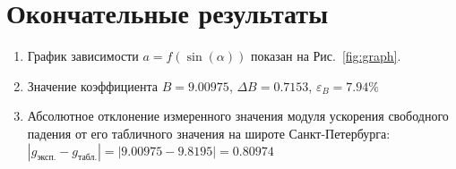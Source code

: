 \section{Окончательные результаты}
\begin{enumerate}
    \item График зависимости $a = f(\sin(\alpha))$ показан на Рис.~\ref{fig:graph}.
    \item Значение коэффициента $B = 9.00975$, $\Delta B = 0.7153$, $\varepsilon_B = 7.94 \%$
    \item Абсолютное отклонение измеренного значения модуля ускорения свободного падения
        от его табличного значения на широте Санкт-Петербурга:
        $ \left| g_{\text{эксп.}} - g_{\text{табл.}} \right| = |9.00975 - 9.8195| = 0.80974 $
\end{enumerate}
